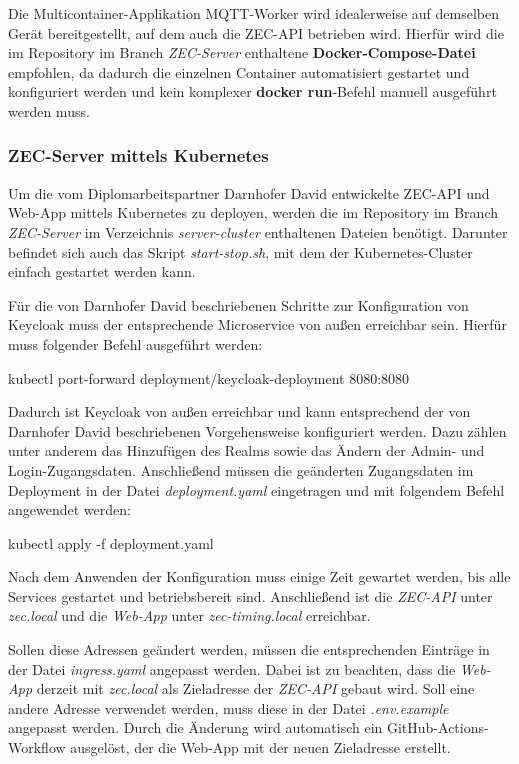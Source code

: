 Die Multicontainer-Applikation MQTT-Worker wird idealerweise auf demselben Gerät bereitgestellt, auf dem auch die ZEC-API betrieben wird. Hierfür wird die im Repository im Branch \textit{ZEC-Server} enthaltene \textbf{Docker-Compose-Datei} empfohlen, da dadurch die einzelnen Container automatisiert gestartet und konfiguriert werden und kein komplexer \textbf{docker run}-Befehl manuell ausgeführt werden muss.

\subsubsection{ZEC-Server mittels Kubernetes}

Um die vom Diplomarbeitspartner Darnhofer David entwickelte ZEC-API und Web-App mittels Kubernetes zu deployen, werden die im Repository im Branch \textit{ZEC-Server} im Verzeichnis \textit{server-cluster} enthaltenen Dateien benötigt. Darunter befindet sich auch das Skript \textit{start-stop.sh}, mit dem der Kubernetes-Cluster einfach gestartet werden kann.

Für die von Darnhofer David beschriebenen Schritte zur Konfiguration von Keycloak muss der entsprechende Microservice von außen erreichbar sein. Hierfür muss folgender Befehl ausgeführt werden:

\begin{CodeBox}
kubectl port-forward deployment/keycloak-deployment 8080:8080
\end{CodeBox}

Dadurch ist Keycloak von außen erreichbar und kann entsprechend der von Darnhofer David beschriebenen Vorgehensweise konfiguriert werden. Dazu zählen unter anderem das Hinzufügen des Realms sowie das Ändern der Admin- und Login-Zugangsdaten. Anschließend müssen die geänderten Zugangsdaten im Deployment in der Datei \textit{deployment.yaml} eingetragen und mit folgendem Befehl angewendet werden:

\begin{CodeBox}
kubectl apply -f deployment.yaml
\end{CodeBox}

Nach dem Anwenden der Konfiguration muss einige Zeit gewartet werden, bis alle Services gestartet und betriebsbereit sind. Anschließend ist die \textit{ZEC-API} unter \textit{zec.local} und die \textit{Web-App} unter \textit{zec-timing.local} erreichbar.

Sollen diese Adressen geändert werden, müssen die entsprechenden Einträge in der Datei \textit{ingress.yaml} angepasst werden. Dabei ist zu beachten, dass die \textit{Web-App} derzeit mit \textit{zec.local} als Zieladresse der \textit{ZEC-API} gebaut wird. Soll eine andere Adresse verwendet werden, muss diese in der Datei \textit{.env.example} angepasst werden. Durch die Änderung wird automatisch ein GitHub-Actions-Workflow ausgelöst, der die Web-App mit der neuen Zieladresse erstellt.
